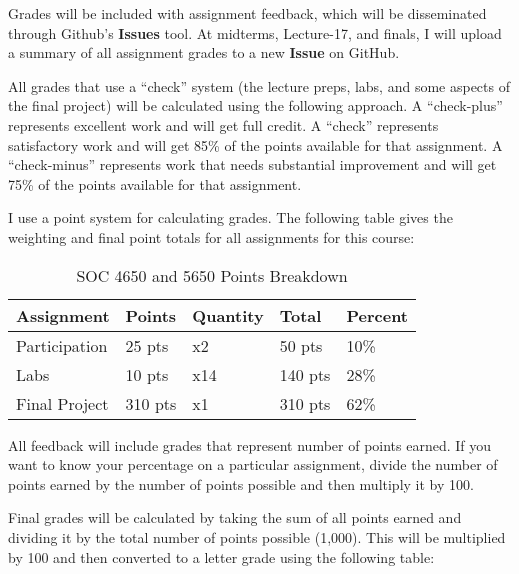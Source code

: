 \documentclass[
]{book}
\begin{document}
Grades will be included with assignment feedback, which will be disseminated through Github's \textbf{Issues} tool. At midterms, Lecture-17, and finals, I will upload a summary of all assignment grades to a new \textbf{Issue} on GitHub.

All grades that use a ``check'' system (the lecture preps, labs, and some aspects of the final project) will be calculated using the following approach. A ``check-plus'' represents excellent work and will get full credit. A ``check'' represents satisfactory work and will get 85\% of the points available for that assignment. A ``check-minus'' represents work that needs substantial improvement and will get 75\% of the points available for that assignment.

I use a point system for calculating grades. The following table gives the weighting and final point totals for all assignments for this course:

\begin{table}

\caption{\label{tab:unnamed-chunk-6}SOC 4650 and 5650 Points Breakdown}
\centering
\begin{tabular}[t]{lllll}
\toprule
Assignment & Points & Quantity & Total & Percent\\
\midrule
Participation & 25 pts & x2 & 50 pts & 10\%\\
Labs & 10 pts & x14 & 140 pts & 28\%\\
Final Project & 310 pts & x1 & 310 pts & 62\%\\
\bottomrule
\end{tabular}
\end{table}

All feedback will include grades that represent number of points earned. If you want to know your percentage on a particular assignment, divide the number of points earned by the number of points possible and then multiply it by 100.

Final grades will be calculated by taking the sum of all points earned and dividing it by the total number of points possible (1,000). This will be multiplied by 100 and then converted to a letter grade using the
following table:
\end{document}
